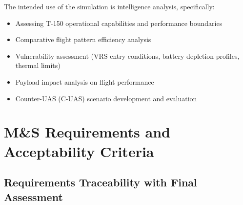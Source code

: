 \documentclass[11pt, letterpaper]{article}
\begin{document}
\unclass The intended use of the simulation is intelligence analysis, specifically:

\begin{itemize}
    \item \unclass Assessing T-150 operational capabilities and performance boundaries
    \item \unclass Comparative flight pattern efficiency analysis
    \item \unclass Vulnerability assessment (VRS entry conditions, battery depletion profiles, thermal limits)
    \item \unclass Payload impact analysis on flight performance
    \item \unclass Counter-UAS (C-UAS) scenario development and evaluation
\end{itemize}

\pagebreak


\section{\unclass M\&S Requirements and Acceptability Criteria}

\subsection{\unclass Requirements Traceability with Final Assessment}
\end{document}
